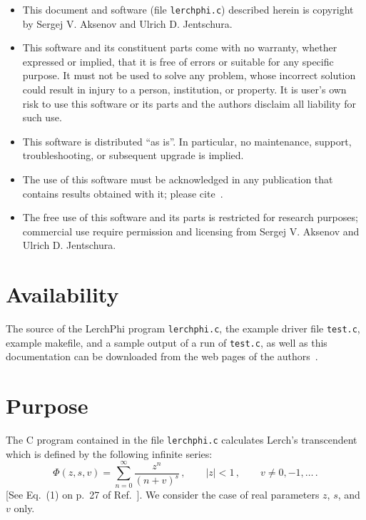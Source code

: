 \documentclass[11pt]{article}
\begin{document}
\begin{itemize}
%
\item This document and software (file {\tt lerchphi.c}) described herein 
is copyright by Sergej V. Aksenov and Ulrich D. Jentschura.
%
\item This software and its constituent parts come with no warranty, 
whether expressed or implied, that it is free of errors or suitable 
for any specific purpose.  It must not be used to solve any problem, 
whose incorrect solution could result in injury to a person, institution, 
or property.  It is user's own risk to use this software or its parts and 
the authors disclaim all liability for such use.
%
\item This software is distributed ``as is''. In particular, no maintenance, 
support, troubleshooting, or subsequent upgrade is implied.
%
\item The use of this software must be acknowledged in any publication 
that contains results obtained with it; please cite~\cite{JeBeSoAkSaMo2002}.
%
\item The free use of this software and its parts is restricted for research 
purposes; commercial use require permission and licensing from Sergej V. 
Aksenov and Ulrich D. Jentschura.
\end{itemize}

\section{Availability}

The source of the LerchPhi program {\tt lerchphi.c}, the example driver file 
{\tt test.c}, example makefile, and a sample output of a run of 
{\tt test.c}, as well as this documentation can be downloaded from the
web pages of the authors~\cite{AkJeURL}.

\section{Purpose}

The C program contained in the file {\tt lerchphi.c} calculates 
Lerch's transcendent which is defined by the following infinite 
series:
%
\begin{equation}
\label{lerch}
\Phi(z,s,v) = \sum_{n=0}^\infty \frac{z^n}{(n+v)^s}\,,  \qquad
|z|<1\,, \qquad v \neq 0,-1,\dots\,.
\end{equation}
%
[See Eq.~(1) on p.~27 of Ref.~\cite{Ba1953vol1}].
We consider the case of real parameters $z$, $s$, and $v$ only.
\end{document}
